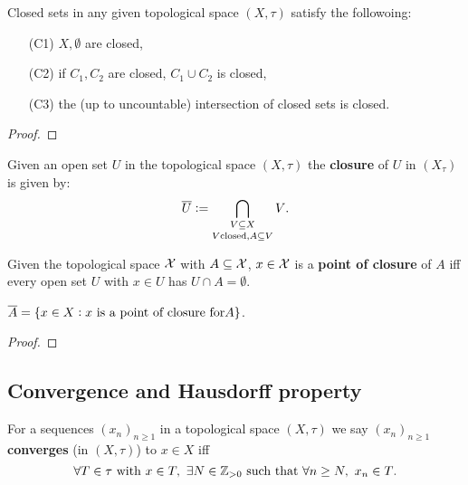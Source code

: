 \documentclass[../Year2.tex]{subfiles}
\begin{document}
\begin{proposition}
    Closed sets in any given topological space $(X,\tau)$ satisfy the followoing: \begin{enumerate}
        \item[(C1)] $X,\emptyset$ are closed,
        \item[(C2)] if $C_1,C_2$ are closed, $C_1\cup C_2$ is closed,
        \item[(C3)] the (up to uncountable) intersection of closed sets is closed.
    \end{enumerate}
    \begin{proof}
        
    \end{proof}
\end{proposition}

\begin{definition}[Closure]
    Given an open set $U$ in the topological space $(X,\tau)$ the \textbf{closure} of $U$ in $(X_\tau)$ is given by: \[
        \overline{U}:=\mathop{\bigcap_{V\subseteq X}}_{V  \text{\textcolor{black}{closed}}, A\subseteq V}V
    \text{\textcolor{black}{.}}
        \]
\end{definition}

\begin{definition}
    Given the topological space $\mathcal{X}$ with $A\subseteq\mathcal{X}$, $x\in\mathcal{X}$ is a \textbf{point of closure} of $A$ iff every open set $U$ with $x\in U$ has $U\cap A=\emptyset$.
\end{definition}

\begin{proposition}
    $\overline{A}=\{x\in X: x \ \text{\textcolor{black}{is a point of closure for}} A\}$.
    \begin{proof}
        
    \end{proof}
\end{proposition}

\subsection{Convergence and Hausdorff property}

\begin{definition}[Convergence]
    For a sequences ${(x_n)}_{n\geq 1}$ in a topological space $(X,\tau)$ we say ${(x_n)}_{n\geq 1}$ \textbf{converges} (in $(X,\tau)$) to $x\in X$ iff \[
        \forall T\in\tau \ \black{with } x\in T, \ \exists N\in\ZZ_{>0} \ \black{such that } \forall n\geq N, \ x_n\in T\black{.}
    \]\vspace{-20pt}
\end{definition}
\end{document}
